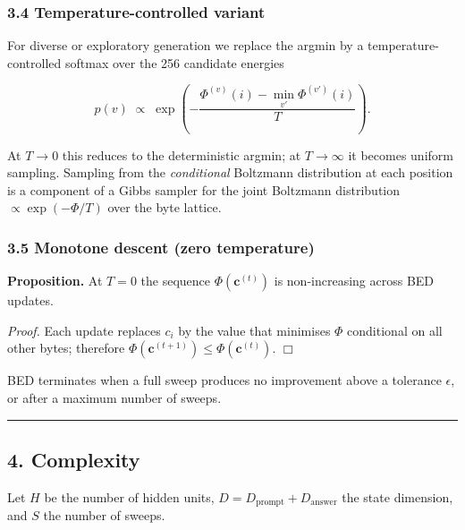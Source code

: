 \documentclass[
  11pt,
  a4paper,
]{article}
\begin{document}
\subsubsection{3.4 Temperature-controlled
variant}\label{temperature-controlled-variant}

For diverse or exploratory generation we replace the argmin by a
temperature-controlled softmax over the 256 candidate energies

\[
p(v) \;\propto\; \exp\!\left( -\frac{\Phi^{(v)}(i) - \min_{v'} \Phi^{(v')}(i)}{T} \right).
\]

At \(T \to 0\) this reduces to the deterministic argmin; at
\(T \to \infty\) it becomes uniform sampling. Sampling from the
\emph{conditional} Boltzmann distribution at each position is a
component of a Gibbs sampler for the joint Boltzmann distribution
\(\propto \exp(-\Phi / T)\) over the byte lattice.

\subsubsection{3.5 Monotone descent (zero
temperature)}\label{monotone-descent-zero-temperature}

\textbf{Proposition.} At \(T = 0\) the sequence
\(\Phi(\mathbf{c}^{(t)})\) is non-increasing across BED updates.

\emph{Proof.} Each update replaces \(c_i\) by the value that minimises
\(\Phi\) conditional on all other bytes; therefore
\(\Phi(\mathbf{c}^{(t+1)}) \le \Phi(\mathbf{c}^{(t)})\). \(\Box\)

BED terminates when a full sweep produces no improvement above a
tolerance \(\epsilon\), or after a maximum number of sweeps.

\begin{center}\rule{0.5\linewidth}{0.5pt}\end{center}

\subsection{4. Complexity}\label{complexity}

Let \(H\) be the number of hidden units,
\(D = D_{\text{prompt}} + D_{\text{answer}}\) the state dimension, and
\(S\) the number of sweeps.
\end{document}
